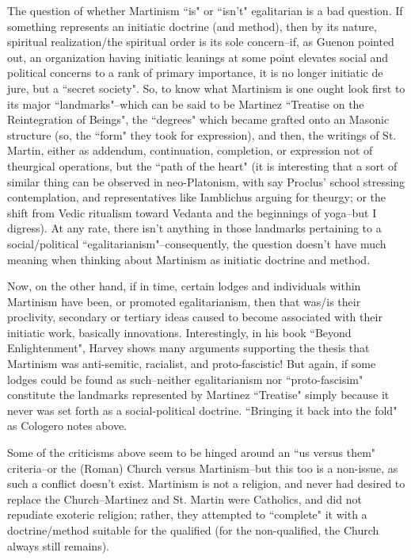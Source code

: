 \begin{footnotesize}
\begin{sffamily}
The question of whether Martinism ``is" or ``isn't" egalitarian is a bad question. If something represents an initiatic doctrine (and method), then by its nature, spiritual realization/the spiritual order is its sole concern–if, as Guenon pointed out, an organization having initiatic leanings at some point elevates social and political concerns to a rank of primary importance, it is no longer initiatic de jure, but a ``secret society". So, to know what Martinism is one ought look first to its major ``landmarks"–which can be said to be Martinez ``Treatise on the Reintegration of Beings", the ``degrees" which became grafted onto an Masonic structure (so, the ``form" they took for expression), and then, the writings of St. Martin, either as addendum, continuation, completion, or expression not of theurgical operations, but the ``path of the heart" (it is interesting that a sort of similar thing can be observed in neo-Platonism, with say Proclus' school stressing contemplation, and representatives like Iamblichus arguing for theurgy; or the shift from Vedic ritualism toward Vedanta and the beginnings of yoga–but I digress). At any rate, there isn't anything in those landmarks pertaining to a social/political ``egalitarianism"–consequently, the question doesn't have much meaning when thinking about Martinism as initiatic doctrine and method.

Now, on the other hand, if in time, certain lodges and individuals within Martinism have been, or promoted egalitarianism, then that was/is their proclivity, secondary or tertiary ideas caused to become associated with their initiatic work, basically innovations. Interestingly, in his book ``Beyond Enlightenment", Harvey shows many arguments supporting the thesis that Martinism was anti-semitic, racialist, and proto-fascistic! But again, if some lodges could be found as such–neither egalitarianism nor ``proto-fascisim" constitute the landmarks represented by Martinez ``Treatise" simply because it never was set forth as a social-political doctrine. ``Bringing it back into the fold" as Cologero notes above.

Some of the criticisms above seem to be hinged around an ``us versus them" criteria–or the (Roman) Church versus Martinism–but this too is a non-issue, as such a conflict doesn't exist. Martinism is not a religion, and never had desired to replace the Church–Martinez and St. Martin were Catholics, and did not repudiate exoteric religion; rather, they attempted to ``complete" it with a doctrine/method suitable for the qualified (for the non-qualified, the Church always still remains).



\end{sffamily}
\end{footnotesize}
